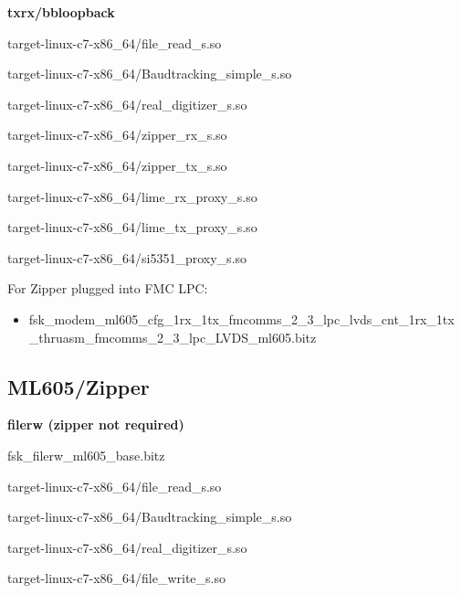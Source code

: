 	\noindent\textbf{txrx/bbloopback}
	\begin{itemize}
	\begin{minipage}[t]{.5\textwidth}
	\item target-linux-c7-x86\_64/file\_read\_s.so
	\item target-linux-c7-x86\_64/Baudtracking\_simple\_s.so
	\item target-linux-c7-x86\_64/real\_digitizer\_s.so
	\item target-linux-c7-x86\_64/zipper\_rx\_s.so
	\end{minipage}
	\begin{minipage}[t]{.5\textwidth}
	\item target-linux-c7-x86\_64/zipper\_tx\_s.so
	\item target-linux-c7-x86\_64/lime\_rx\_proxy\_s.so
	\item target-linux-c7-x86\_64/lime\_tx\_proxy\_s.so
	\item target-linux-c7-x86\_64/si5351\_proxy\_s.so
	\end{minipage}
	\end{itemize}
	For Zipper plugged into FMC LPC:
	\begin{itemize}
		\item fsk\_modem\_ml605\_cfg\_1rx\_1tx\_fmcomms\_2\_3\_lpc\_lvds\_cnt\_1rx\_1tx\\
\_thruasm\_fmcomms\_2\_3\_lpc\_LVDS\_ml605.bitz
	\end{itemize}







\pagebreak
\subsection{ML605/Zipper}
	\noindent\textbf{filerw (zipper not required)}
	\begin{itemize}
	\begin{minipage}[t]{.5\textwidth}
	\item fsk\_filerw\_ml605\_base.bitz
	\item target-linux-c7-x86\_64/file\_read\_s.so
	\item target-linux-c7-x86\_64/Baudtracking\_simple\_s.so
	\end{minipage}
	\begin{minipage}[t]{.5\textwidth}
	\item target-linux-c7-x86\_64/real\_digitizer\_s.so
	\item target-linux-c7-x86\_64/file\_write\_s.so
	\end{minipage}
	\end{itemize}
	
